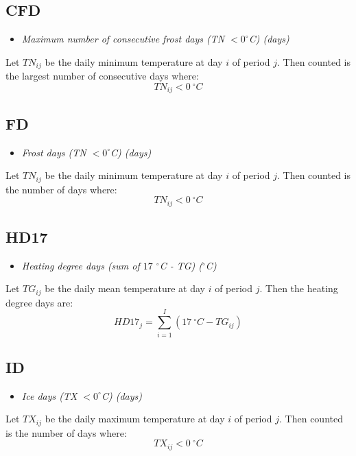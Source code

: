 \documentclass[a4paper,11pt]{article}
\begin{document}
\subsection*{CFD}
\begin{itemize}
\item \textit{Maximum number of consecutive frost days (TN $< 0^\circ$C) (days)}
\end{itemize}
Let $TN_{ij}$ be the daily minimum temperature at day $i$ of period
$j$. Then counted is the largest number of consecutive days where:
\begin{equation*}
TN_{ij} < 0 \:^\circ C
\end{equation*}

\subsection*{FD}
\begin{itemize}
\item \textit{Frost days (TN $< 0^\circ$C) (days)}
\end{itemize}
Let $TN_{ij}$ be the daily minimum temperature at day $i$ of period
$j$. Then counted is the number of days where:
\begin{equation*}
TN_{ij} < 0 \:^\circ C
\end{equation*}

\subsection*{HD17}
\begin{itemize}
\item \textit{Heating degree days (sum of $17$ $^\circ$C - TG)
($^\circ$C)}
\end{itemize}
Let $TG_{ij}$ be the daily mean temperature at day $i$ of period
$j$. Then the heating degree days are:
\begin{equation*}
HD17_{j} = \sum_{i=1}^{I}(17 \:^\circ C - TG_{ij})
\end{equation*}

\subsection*{ID}
\begin{itemize}
\item \textit{Ice days (TX $< 0^\circ$C) (days)}
\end{itemize}
Let $TX_{ij}$ be the daily maximum temperature at day $i$ of period
$j$. Then counted is the number of days where:
\begin{equation*}
TX_{ij} < 0\: ^\circ C
\end{equation*}
\end{document}

